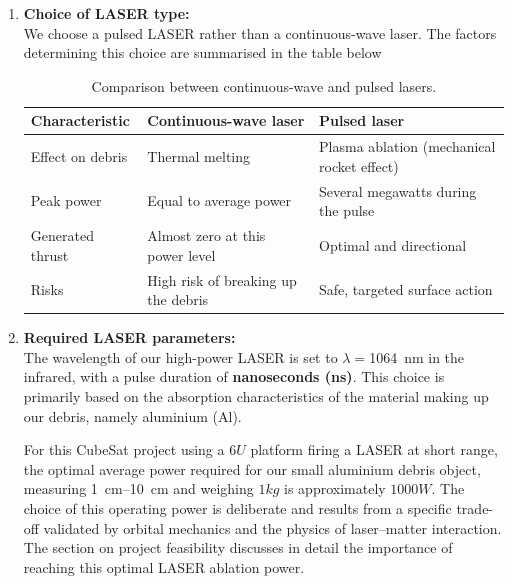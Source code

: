 \documentclass[11pt,a4paper]{article}
\begin{document}
\begin{enumerate}
    \item \textbf{Choice of LASER type:}\\
    We choose a pulsed LASER rather than a continuous-wave laser. 
    The factors determining this choice are summarised in the table below

    \begin{table}[H]
      \centering
      \caption{Comparison between continuous-wave and pulsed lasers.}
      \begin{tabular}{p{3.5cm} p{5.5cm} p{5.5cm}}
        \toprule
        \textbf{Characteristic} & \textbf{Continuous-wave laser } & \textbf{Pulsed laser} \\
        \midrule
        Effect on debris & Thermal melting  & Plasma ablation (mechanical rocket effect) \\
        Peak power & Equal to average power  & Several megawatts during the pulse \\
        Generated thrust & Almost zero at this power level & Optimal and directional \\
        Risks & High risk of breaking up the debris & Safe, targeted surface action \\
        \bottomrule
      \end{tabular}
    \end{table}

    \item \textbf{Required LASER parameters:}\\
    The wavelength of our high-power LASER is set to $\lambda = $\SI{1064}{\nano\metre} in the infrared, with a pulse duration of \textbf{nanoseconds (ns)}. This choice is primarily based on the absorption characteristics of the material making up our debris, namely aluminium (Al).

    For this CubeSat project using a $6U$ platform firing a LASER at short range, the optimal average power required for our small aluminium debris object, measuring \SIrange{1}{10}{\centi\metre} and weighing $1kg$ is approximately $1000W$. The choice of this operating power is deliberate and results from a specific trade-off validated by orbital mechanics and the physics of laser--matter interaction. The section on project feasibility discusses in detail the importance of reaching this optimal LASER ablation power.


\end{enumerate}
\end{document}
